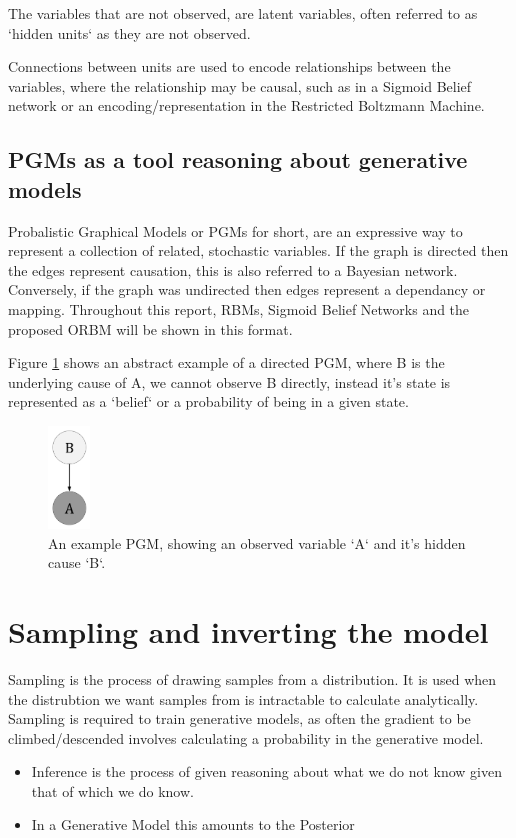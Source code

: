 The variables that are not observed, are latent variables, often referred to as `hidden units` as they are not observed.

Connections between units are used to encode relationships between the variables, where the relationship may be causal, such as in a Sigmoid Belief network or an encoding/representation in the Restricted Boltzmann Machine.


\subsection{PGMs as a tool reasoning about generative models}
\todo%
Probalistic Graphical Models or PGMs for short, are an expressive way to represent a collection of related, stochastic variables. If the graph is directed then the edges represent causation, this is also referred to a Bayesian network. Conversely, if the graph was undirected then edges represent a dependancy or mapping. Throughout this report, RBMs, Sigmoid Belief Networks and the proposed ORBM will be shown in this format.

Figure \ref{F:PGM-example} shows an abstract example of a directed PGM, where B is the underlying cause of A, we cannot observe B directly, instead it's state is represented as a `belief` or a probability of being in a given state.

\begin{figure}[h]
\begin{center}
  \includegraphics[width = 0.1\textwidth]{Assets/PGM_Example_1.png}
\caption{An example PGM, showing an observed variable `A` and it's hidden cause `B`.}
\label{F:PGM-example}
\end{center}
\end{figure}

\section{Sampling and inverting the model}
Sampling is the process of drawing samples from a distribution. It is used when the distrubtion we want samples from is intractable to calculate analytically. Sampling is required to train generative models, as often the gradient to be climbed/descended involves calculating a probability in the
generative model.
\todo%
\begin{itemize}
  \item Inference is the process of given reasoning about what we do not know given that of which we do know.
  \item In a Generative Model this amounts to the Posterior
\end{itemize}

